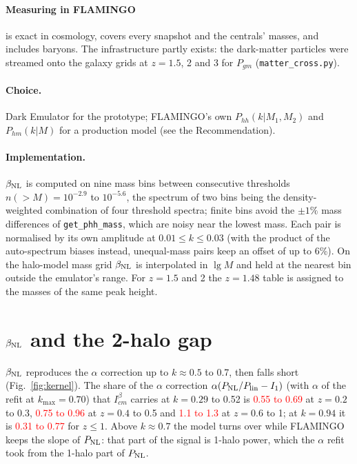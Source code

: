 \documentclass[11pt]{article}
\newcommand{\Plin}{P_{\rm lin}}
\newcommand{\PNL}{P_{\rm NL}}
\newcommand{\bNL}{\beta_{\rm NL}}
\newcommand{\kmax}{k_{\max}}
\newcommand{\Ib}[1]{I^{\beta}_{#1}}
\newif\ifnumbersfinal
\newcommand{\refresh}[1]{\ifnumbersfinal#1\else\textcolor{red}{#1}\fi}
\newcommand{\ShareLowZ}{\refresh{0.55 to 0.69}}
\newcommand{\ShareMidZ}{\refresh{0.75 to 0.96}}
\newcommand{\ShareHighZ}{\refresh{1.1 to 1.3}}
\newcommand{\ShareHighK}{\refresh{0.31 to 0.77}}
\begin{document}
\paragraph{Measuring in FLAMINGO} is exact in cosmology, covers every
snapshot and the centrals' masses, and includes baryons. The infrastructure
partly exists: the dark-matter particles were streamed onto the galaxy grids
at $z = 1.5$, 2 and 3 for $P_{gm}$ (\texttt{matter\_cross.py}).

\paragraph{Choice.} Dark Emulator for the prototype; FLAMINGO's own
$P_{hh}(k|M_1, M_2)$ and $P_{hm}(k|M)$ for a production model (see the
Recommendation).

\paragraph{Implementation.} $\bNL$ is computed on nine mass bins between
consecutive thresholds $n(>M) = 10^{-2.9}$ to $10^{-5.6}$, the spectrum of two
bins being the density-weighted combination of four threshold spectra; finite
bins avoid the $\pm1\%$ mass differences of \texttt{get\_phh\_mass}, which are
noisy near the lowest mass. Each pair is normalised by its own amplitude at
$0.01 \le k \le 0.03$ (with the product of the auto-spectrum biases instead,
unequal-mass pairs keep an offset of up to 6\%). On the halo-model mass grid
$\bNL$ is interpolated in $\lg M$ and held at the nearest bin outside the
emulator's range. For $z = 1.5$ and 2 the $z = 1.48$ table is assigned to the
masses of the same peak height.

\section{\texorpdfstring{$\bNL$}{beta\_NL} and the 2-halo gap}
\label{sec:gap}

$\bNL$ reproduces the $\alpha$ correction up to $k \approx 0.5$ to 0.7, then
falls short (Fig.~\ref{fig:kernel}). The share of the $\alpha$ correction
$\alpha(\PNL/\Plin - I_1)$ (with $\alpha$ of the refit at $\kmax = 0.70$) that
$\Ib{cm}$ carries at $k = 0.29$ to 0.52 is \ShareLowZ{} at $z = 0.2$ to 0.3,
\ShareMidZ{} at $z = 0.4$ to 0.5 and \ShareHighZ{} at $z = 0.6$ to 1; at
$k = 0.94$ it is \ShareHighK{} for $z \le 1$. Above $k \approx 0.7$ the model
turns over while FLAMINGO keeps the slope of $\PNL$: that part of the signal
is 1-halo power, which the $\alpha$ refit took from the 1-halo part of $\PNL$.
\end{document}
